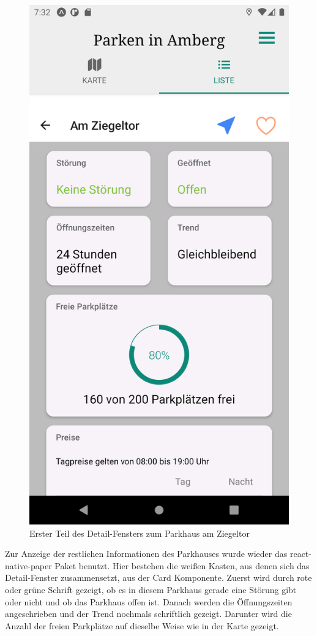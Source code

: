 \begin{figure}
	\vspace{-\baselineskip}
	\centering
	\includegraphics[scale=0.13]{img/details1}
	\caption{Erster Teil des Detail-Fensters zum Parkhaus am Ziegeltor}
	\label{fig:details1}
\end{figure}
Zur Anzeige der restlichen Informationen des Parkhauses wurde wieder das react-native-paper Paket benutzt. Hier bestehen die weißen Kasten, aus denen sich das Detail-Fenster zusammensetzt, aus der Card Komponente. Zuerst wird durch rote oder grüne Schrift gezeigt, ob es in diesem Parkhaus gerade eine Störung gibt oder nicht und ob das Parkhaus offen ist. Danach werden die Öffnungszeiten angeschrieben und der Trend nochmals schriftlich gezeigt. Darunter wird die Anzahl der freien Parkplätze auf dieselbe Weise wie in der Karte gezeigt.

